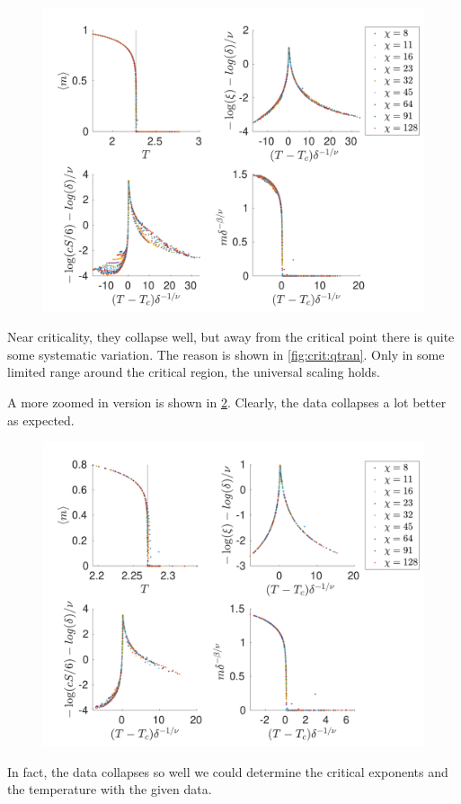 \begin{figure}
    \center
    \includegraphics[width=\textwidth]{Figuren/phasediag/g0/Full.pdf}
    \caption{  }
    \label{fig:phase:g0:full}
\end{figure}


Near criticality, they collapse well, but away from the critical point there is quite some systematic variation. The reason is shown in \cref{fig:crit:qtran}. Only in some limited range around the critical region, the universal scaling holds.

A more zoomed in version is shown in \cref{fig:phase:g0:zoomed}. Clearly, the data collapses a lot better as expected.
\begin{figure}
    \center
    \includegraphics[width=\textwidth]{Figuren/phasediag/g0/zoomed.pdf}
    \caption{  }
    \label{fig:phase:g0:zoomed}
\end{figure}
In fact, the data collapses so well we could determine the critical exponents and the temperature with the given data.


